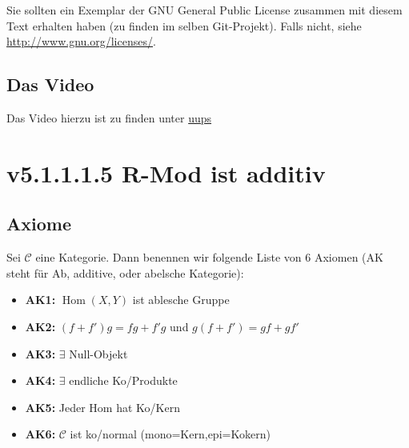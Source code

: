 \documentclass[a4paper]{amsart}
\theoremstyle{definition}
\DeclareMathOperator{\Hom}{Hom}
\newcommand{\CC}{\ensuremath{\mathcal{ C }}}
\begin{document}
Sie sollten ein Exemplar der GNU General Public License zusammen mit diesem Text erhalten haben
(zu finden im selben Git-Projekt).
Falls nicht, siehe \url{http://www.gnu.org/licenses/}.

\subsection*{Das Video}
Das Video hierzu ist zu finden unter
{\tiny
   \url{uups}
}

\section{v5.1.1.1.5 R-Mod ist additiv}

\subsection{Axiome}
Sei $\CC$ eine Kategorie. Dann benennen wir folgende Liste von 6 Axiomen (AK steht für Ab, additive, oder abelsche Kategorie):
\begin{itemize}
   \item \textbf{AK1:} $\Hom(X,Y)$ ist ablesche Gruppe 
   \item \textbf{AK2:} $(f + f')g = fg + f'g$ und $g(f + f') = gf + gf'$
   \item \textbf{AK3:} $\exists$ Null-Objekt
   \item \textbf{AK4:} $\exists$ endliche Ko/Produkte
   \item \textbf{AK5:} Jeder Hom hat Ko/Kern
   \item \textbf{AK6:} $\CC$ ist ko/normal (mono=Kern,epi=Kokern)
\end{itemize}
\end{document}

